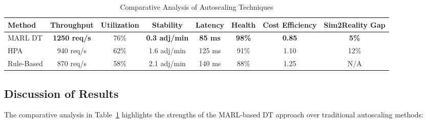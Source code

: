 \documentclass[conference]{IEEEtran}
\begin{document}
\begin{table}[h]
\centering
\caption{Comparative Analysis of Autoscaling Techniques}
\label{tab:autoscaling_comparison}
\begin{tabular}{lccccccc}
\hline
\textbf{Method} & \textbf{Throughput} & \textbf{Utilization} & \textbf{Stability} & \textbf{Latency} & \textbf{Health} & \textbf{Cost Efficiency} & \textbf{Sim2Reality Gap} \\
\hline
MARL DT & \textbf{1250 req/s} & 76\% & \textbf{0.3 adj/min} & \textbf{85 ms} & \textbf{98\%} & \textbf{0.85} & \textbf{5\%} \\
HPA & 940 req/s & 62\% & 1.6 adj/min & 125 ms & 91\% & 1.10 & 12\% \\
Rule-Based & 870 req/s & 58\% & 2.1 adj/min & 140 ms & 88\% & 1.25 & N/A \\
\hline
\end{tabular}
\end{table}

\subsection{Discussion of Results}

The comparative analysis in Table~\ref{tab:autoscaling_comparison} highlights the strengths of the MARL-based DT approach over traditional autoscaling methods:
\end{document}
